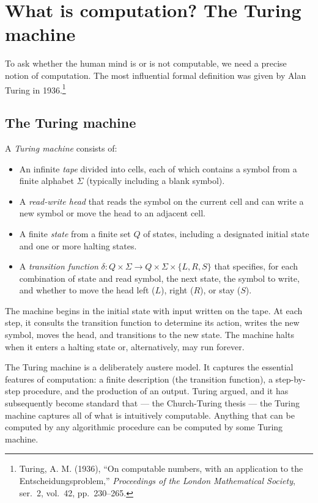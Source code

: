 \section{What is computation? The Turing machine}
\label{sec:computation-defined}

To ask whether the human mind is or is not computable, we need a
precise notion of computation. The most influential formal
definition was given by Alan Turing in 1936.\footnote{Turing, A. M.
(1936), ``On computable numbers, with an application to the
Entscheidungsproblem,'' \emph{Proceedings of the London Mathematical
Society}, ser.\ 2, vol.\ 42, pp.\ 230--265.}

\subsection{The Turing machine}

\begin{definition}
\label{def:turing-machine}
A \emph{Turing machine} consists of:
\begin{itemize}[leftmargin=2em]
    \item An infinite \emph{tape} divided into cells, each of which
    contains a symbol from a finite alphabet $\Sigma$ (typically
    including a blank symbol).
    \item A \emph{read-write head} that reads the symbol on the
    current cell and can write a new symbol or move the head to an
    adjacent cell.
    \item A finite \emph{state} from a finite set $Q$ of states,
    including a designated initial state and one or more halting
    states.
    \item A \emph{transition function} $\delta: Q \times \Sigma
    \to Q \times \Sigma \times \{L, R, S\}$ that specifies, for each
    combination of state and read symbol, the next state, the symbol
    to write, and whether to move the head left ($L$), right
    ($R$), or stay ($S$).
\end{itemize}
The machine begins in the initial state with input written on the
tape. At each step, it consults the transition function to determine
its action, writes the new symbol, moves the head, and transitions
to the new state. The machine halts when it enters a halting state
or, alternatively, may run forever.
\end{definition}

The Turing machine is a deliberately austere model. It captures the
essential features of computation: a finite description (the
transition function), a step-by-step procedure, and the production
of an output. Turing argued, and it has subsequently become standard
that --- the Church-Turing thesis --- the Turing machine captures
all of what is intuitively computable. Anything that can be computed
by any algorithmic procedure can be computed by some Turing machine.

